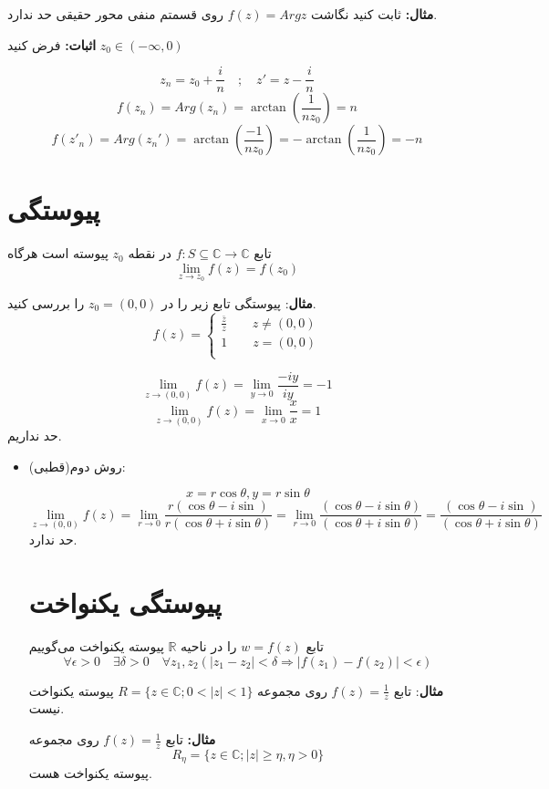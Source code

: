 \documentclass[12pt]{report}
\begin{document}
	 	 	 	  \textbf{مثال:}
	 	 	 	  ثابت کنید نگاشت 
	 	 	 	  $f(z) = Arg z$
	 	 	 	  روی قسمتم منفی محور حقیقی حد ندارد.
	 	 	 	  
	 	 	 	  \textbf{اثبات:}
	 	 	 	  فرض کنید
	 	 	 	  $z_0 \in (- \infty , 0)$
	 	 	 	  
	 	 	 	  $$z_n = z_0 + \frac{i}{n} \quad ; \quad z' = z  - \frac{i}{n}$$
	 	 	 	  $$f(z_n) = Arg(z_n) = \arctan(\frac{1}{nz_0}) = n$$
	 	 	 	  $$f(z'_n) = Arg(z_n') =\arctan(\frac{-1}{nz_0}) = -\arctan(\frac{1}{nz_0}) = -n$$	
	 	 	 	  
	 	 	 	  \section{پیوستگی}
	 	 	 	  تابع 
	 	 	 	  $f: S \subseteq \mathbb{C} \rightarrow \mathbb{C}$
	 	 	 	  در نقطه 
	 	 	 	  $z_0$
	 	 	 	  پیوسته است هرگاه
	 	 	 	  $$\lim_{z \to z_0} f(z) = f(z_0)$$
	 	 	 	  
	 	 	 	  \textbf{مثال}:
	 	 	 	  پیوستگی تابع زیر را در 
	 	 	 	  $z_0 = (0, 0)$
	 	 	 	  را بررسی کنید.
	 	 	 	  \[
	 	 	 	  f(z)=
	 	 	 	  \begin{cases}
	 	 	 	  	\frac{\bar{z}}{z} \qquad z \neq (0,0) \\
	 	 	 	  	1 \qquad z = (0,0)\\
	 	 	 	  \end{cases}
	 	 	 	  \]
	 	 	 	  
	 	 	 	  $$\lim_{z \to (0,0)} f(z) = \lim_{y \to 0} \frac{-iy}{iy} = -1$$
	 	 	 	  $$\lim_{z \to (0,0)} f(z) = \lim_{x \to 0} \frac{x}{x} = 1$$
	 	 	 	  حد نداریم.
	 	 	 	  
	 	 	 	  \begin{itemize}
	 	 	 	  	\item 
	 	 	 	  	روش دوم(قطبی):
	 	 	 	  	
	 	 	 	  	$$x = r\cos \theta , y = r\sin \theta$$
	 	 	 	  	$$\lim_{z \to (0,0)} f(z) = \lim_{r \to 0} \frac{r(\cos \theta - i\sin)}{r(\cos \theta + i \sin \theta)} = \lim_{r \to 0} \frac{(\cos \theta - i\sin \theta)}{(\cos \theta + i \sin \theta)} = \frac{(\cos \theta - i\sin)}{(\cos \theta + i \sin \theta)}$$
	 	 	 	  	حد ندارد.
	 	 	 	  	\section{پیوستگی یکنواخت}
	 	 	 	  	تابع
	 	 	 	  	$w = f(z)$
	 	 	 	  	را در ناحیه 
	 	 	 	  	$\mathbb{R}$
	 	 	 	  	پیوسته یکنواخت می‌گوییم
	 	 	 	  	$$\forall \epsilon > 0 \quad \exists \delta > 0  \quad \forall z_1, z_2 (|z_1 - z_2| < \delta \Rightarrow |f(z_1) - f(z_2)| < \epsilon)$$
	 	 	 	  	
	 	 	 	  	\textbf{مثال}:
	 	 	 	  	تابع 
	 	 	 	  	$f(z) = \frac{1}{z}$
	 	 	 	  	روی مجموعه 
	 	 	 	  	$R = \{z \in \mathbb{C} ; 0<|z|<1\}$
 	 	 	  	پیوسته یکنواخت نیست.
 	 	 	  	
 	 	 	  	\textbf{مثال:}
 	 	 	  	تابع
	 	 	 	  		 	 	 	  	$f(z) = \frac{1}{z}$
	 	 	 	  	روی مجموعه
	 	 	 	  	$$R_\eta = \{z \in \mathbb{C} ; |z|\geq \eta , \eta > 0\}$$
	 	 	 	  	پیوسته یکنواخت هست.
	 	 	 	  \end{itemize}
 	 	 	  
\end{document}
